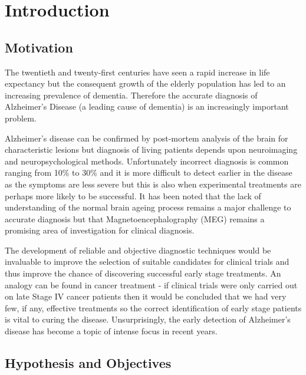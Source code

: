 \chapter{Introduction}

 

\section{Motivation}

The twentieth and twenty-first centuries have seen a rapid increase in life expectancy but the consequent growth of the elderly population has led to an increasing prevalence of dementia.\cite{Hebert2014} Therefore the accurate diagnosis of Alzheimer's Disease (a leading cause of dementia) is an increasingly important problem.

Alzheimer's disease can be confirmed by post-mortem analysis of the brain for characteristic lesions but diagnosis of living patients depends upon neuroimaging and neuropsychological methods. Unfortunately incorrect diagnosis is common ranging from 10\% to 30\% and it is more difficult to detect earlier in the disease as the symptoms are less severe but this is also when experimental treatments are perhaps more likely to be successful. It has been noted that the lack of understanding of the normal brain ageing process remains a major challenge to accurate diagnosis but that Magnetoencephalography (MEG) remains a promising area of investigation for clinical diagnosis.\cite{Fernandez2013}

The development of reliable and objective diagnostic techniques would be invaluable to improve the selection of suitable candidates for clinical trials and thus improve the chance of discovering successful early stage treatments. An analogy can be found in cancer treatment - if clinical trials were only carried out on late Stage IV cancer patients then it would be concluded that we had very few, if any, effective treatments so the correct identification of early stage patients is vital to curing the disease. Unsurprisingly, the early detection of Alzheimer's disease has become a topic of intense focus in recent years. \cite{Nestor2004}



\section{Hypothesis and Objectives}

